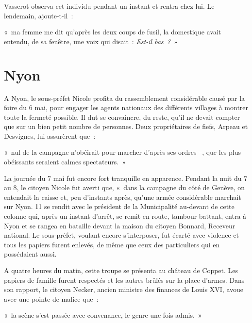 \documentclass[french,twoside]{book} %
\newenvironment{quoteblock}%
  {\begin{quoting}}
  {\end{quoting}}
\newenvironment{quotebar}{%
    \def\FrameCommand{{\color{rubric!10!}\vrule width 0.5em} \hspace{0.9em}}%
    \def\OuterFrameSep{\itemsep} %
    \MakeFramed {\advance\hsize-\width \FrameRestore}
  }%
  {%
    \endMakeFramed
  }
\renewenvironment{quoteblock}%
  {%
    \savenotes
    \setstretch{0.9}
    \normalfont
    \begin{quotebar}
  }
  {%
    \end{quotebar}
    \spewnotes
  }
\begin{document}
\noindent Vasserot observa cet individu pendant un instant et rentra chez lui. Le lendemain, ajoute-t-il :\par

\begin{quoteblock}
\noindent « ma femme me dit qu’après les deux coups de fusil, la domestique avait entendu, de sa fenêtre, une voix qui disait : \emph{Est-il bas ?} »\end{quoteblock}

\section[Nyon]{Nyon}
\noindent A Nyon, le sous-préfet Nicole profita du rassemblement considérable causé par la foire du 6 mai, pour engager les agents nationaux des différents villages à montrer toute la fermeté possible. Il dut se convaincre, du reste, qu’il ne devait compter que sur un bien petit nombre de personnes. Deux propriétaires de fiefs, Arpeau et Desvignes, lui assurèrent que :\par

\begin{quoteblock}
\noindent « nul de la campagne n’obéirait pour marcher d’après ses ordres –, que les plus obéissants seraient calmes spectateurs. »\end{quoteblock}

\noindent La journée du 7 mai fut encore fort tranquille en apparence. Pendant la nuit du 7 au 8, le citoyen Nicole fut averti que, « dans la campagne du côté de Genève, on entendait la caisse et, peu d’instants après, qu’une armée considérable marchait sur Nyon. 11 se rendit avec le président de la Municipalité au-devant de cette colonne qui, après un instant d’arrêt, se remit en route, tambour battant, entra à Nyon et se rangea en bataille devant la maison du citoyen Bonnard, Receveur national. Le sous-préfet, voulant encore s’interposer, fut écarté avec violence et tous les papiers furent enlevés, de même que ceux des particuliers qui en possédaient aussi.\par
A quatre heures du matin, cette troupe se présenta au château de Coppet. Les papiers de famille furent respectés et les autres brûlés sur la place d’armes. Dans son rapport, le citoyen Necker, ancien ministre des finances de Louis XVI, avoue avec une pointe de malice que :\par

\begin{quoteblock}
\noindent « la scène s’est passée avec convenance, le genre une fois admis. »\end{quoteblock}
\end{document}
